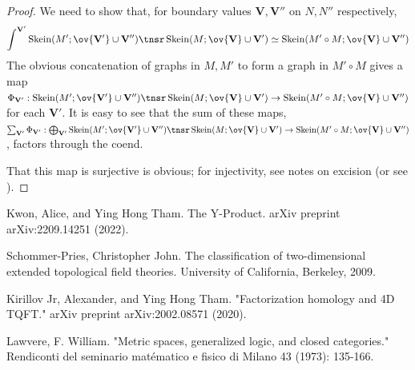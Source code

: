 \documentclass[12pt]{article}
\newcommand{\VV}{{\mathbf{V}}}
\DeclareMathOperator{\Skein}{Skein}
\begin{document}
\begin{proof}
We need to show that, for boundary values
$\VV,\VV''$ on $N,N''$ respectively,
\[
\int^{\VV'} \Skein(M';\ov{\VV'} \cup \VV'')
\tnsr \Skein(M; \ov{\VV} \cup \VV')
\simeq \Skein(M' \circ M; \ov{\VV} \cup \VV'')
\]
The obvious concatenation of graphs
in $M,M'$ to form a graph in $M' \circ M$
gives a map
$\Phi_{\VV'}: \Skein(M';\ov{\VV'} \cup \VV'')
\tnsr \Skein(M; \ov{\VV} \cup \VV')
\to \Skein(M' \circ M; \ov{\VV} \cup \VV'')$
for each $\VV'$.
It is easy to see that the sum of these maps,
$\sum_{\VV'} \Phi_{\VV'}:
\bigoplus_{\VV'} \Skein(M';\ov{\VV'} \cup \VV'')
\tnsr \Skein(M; \ov{\VV} \cup \VV')
\to \Skein(M' \circ M; \ov{\VV} \cup \VV'')$,
factors through the coend.

That this map is surjective is obvious;
for injectivity, see notes on excision
(or see \cite{KT}).
\end{proof}


%
%
%



\begin{thebibliography}{1}

 Kwon, Alice, and Ying Hong Tham. The Y-Product. arXiv preprint arXiv:2209.14251 (2022).

 Schommer-Pries, Christopher John. The classification of two-dimensional extended topological field theories. University of California, Berkeley, 2009.

 Kirillov Jr, Alexander, and Ying Hong Tham. "Factorization homology and 4D TQFT." arXiv preprint arXiv:2002.08571 (2020).

 Lawvere, F. William. "Metric spaces, generalized logic, and closed categories." Rendiconti del seminario matématico e fisico di Milano 43 (1973): 135-166.

\end{thebibliography}
\end{document}
